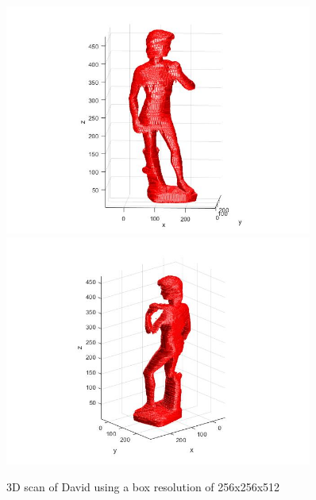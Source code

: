 \documentclass[12pt]{article}
\begin{document}
\vspace{5mm}
\begin{figure}[H]
	\centering
	\includegraphics[width=0.9\textwidth]{david512_1.jpg}
	\includegraphics[width=0.9\textwidth]{david512_2.jpg}
	\caption{3D scan of David using a box resolution of 256x256x512}
	\label{fig1}
\end{figure}
\vspace{5mm}
\end{document}
